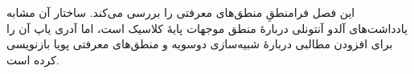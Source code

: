 \documentclass[../../../include/open-logic-chapter]{subfiles}
\begin{document}

\begin{editorial}
  این فصل فرامنطقِ منطق‌های معرفتی را بررسی می‌کند. ساختار آن مشابه
  یادداشت‌های آلدو آنتونلی دربارهٔ منطق موجهات پایهٔ کلاسیک است، اما
  آدری یاپ آن را برای افزودن مطالبی دربارهٔ شبیه‌سازی دوسویه و منطق‌های
  معرفتی پویا بازنویسی کرده است.
\end{editorial}



\OLEndChapterHook
\end{document}
